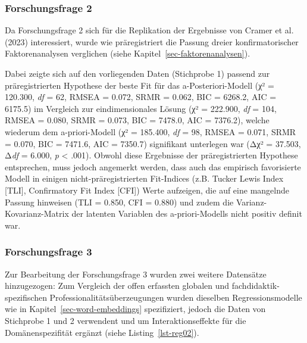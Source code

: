 \documentclass[
  letterpaper,
  DIV=11]{scrartcl}
\begin{document}
\subsubsection{Forschungsfrage 2}\label{sec-ergebnisseff2}

Da Forschungsfrage 2 sich für die Replikation der Ergebnisse von Cramer
et al. (2023) interessiert, wurde wie präregistriert die Passung dreier
konfirmatorischer Faktorenanalysen verglichen (siehe
Kapitel~\ref{sec-faktorenanalysen}).

Dabei zeigte sich auf den vorliegenden Daten (Stichprobe 1) passend zur
präregistrierten Hypothese der beste Fit für das a-Posteriori-Modell (χ²
= 120.300, \emph{df} = 62, RMSEA = 0.072, SRMR = 0.062, BIC = 6268.2,
AIC = 6175.5) im Vergleich zur eindimensionales Lösung (χ² = 222.900,
\emph{df} = 104, RMSEA = 0.080, SRMR = 0.073, BIC = 7478.0, AIC =
7376.2), welche wiederum dem a-priori-Modell (χ² = 185.400, \emph{df} =
98, RMSEA = 0.071, SRMR = 0.070, BIC = 7471.6, AIC = 7350.7) signifikant
unterlegen war (Δχ² = 37.503, Δ\emph{df} = 6.000, \emph{p} \textless{}
.001). Obwohl diese Ergebnisse der präregistrierten Hypothese
entsprechen, muss jedoch angemerkt werden, dass auch das empirisch
favorisierte Modell in einigen nicht-präregistrierten Fit-Indices (z.B.
Tucker Lewis Index {[}TLI{]}, Confirmatory Fit Index {[}CFI{]}) Werte
aufzeigen, die auf eine mangelnde Passung hinweisen (TLI = 0.850, CFI =
0.880) und zudem die Varianz-Kovarianz-Matrix der latenten Variablen des
a-priori-Modells nicht positiv definit war.

\subsubsection{Forschungsfrage 3}\label{forschungsfrage-3}

Zur Bearbeitung der Forschungsfrage 3 wurden zwei weitere Datensätze
hinzugezogen: Zum Vergleich der offen erfassten globalen und
fachdidaktik-spezifischen Professionalitätsüberzeugungen wurden
dieselben Regressionsmodelle wie in Kapitel~\ref{sec-word-embeddings}
spezifiziert, jedoch die Daten von Stichprobe 1 und 2 verwendent und um
Interaktionseffekte für die Domänenspezifität ergänzt (siehe
Listing~\ref{lst-reg02}).
\end{document}

